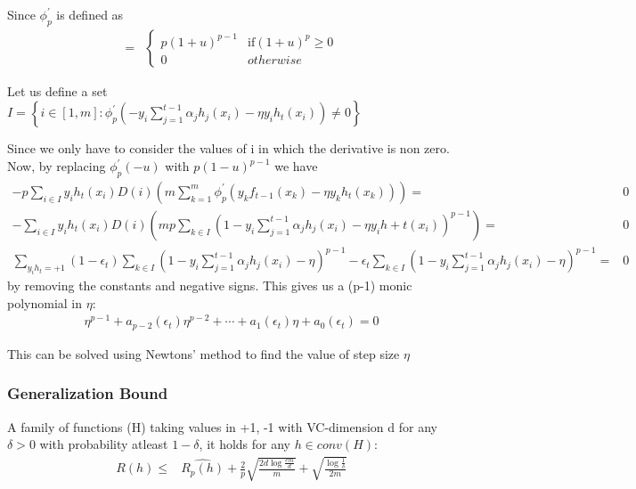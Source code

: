 \documentclass{article}
\begin{document}
Since $\phi^{'}_{p}$ is defined as 
\begin{align*}
  =& \begin{cases}
  p{(1+u)}^{p-1} & \mathrm{if } {(1+u)}^{p} \ge 0 \\
  0 & otherwise
     \end{cases}
\end{align*}

Let us define a set \( I =  \left\{ i \in [1,m] : \phi^{'}_{p}\left( -y_{i}\sum_{j=1}^{t-1} \alpha_{j}h_{j}(x_{i}) - \eta y_{i}h_{t}(x_{i}) \right) \ne 0\right\} \)

Since we  only have to consider the values of i in which the derivative is non zero.  Now, by replacing $\phi^{'}_{p}(-u)$ with $p{(1-u)}^{p-1} $ we have
\begin{align*}
  -p\sum_{i \in I}y_{i}h_{t}(x_{i})D(i)\left(m\sum_{k=1}^{m}\phi^{'}_{p}(y_{k}f_{t-1}(x_{k}) - \eta y_{k}h_{t}(x_{k}) )\right) = & 0 \\
  -\sum_{i \in I} y_{i}h_{t}(x_{i}) D(i) \left( mp\sum_{k\in I}{\left( 1 - y_{i}\sum_{j=1}^{t-1} \alpha_{j}h_{j}(x_{i}) - \eta y_{i}h+{t}(x_{i}) \right)}^{p-1} \right) = & 0 \\
  \sum_{y_{i}h_{t} = +1} (1 - \epsilon_{t})\sum_{k \in I} {\left( 1 - y_{i}\sum_{j=1}^{t-1} \alpha_{j}h_{j}(x_{i}) - \eta \right)}^{p-1} - \epsilon_{t} \sum_{k \in I}  {\left( 1 - y_{i}\sum_{j=1}^{t-1} \alpha_{j}h_{j}(x_{i}) - \eta \right)}^{p-1} = & 0
\end{align*}
by removing the constants and negative signs.  This gives us a (p-1) monic polynomial in $\eta$: 
\begin{align*}
  \eta^{p-1} + a_{p-2}(\epsilon_{t})\eta^{p-2} + \cdots + a_{1}(\epsilon_{t})\eta + a_{0}(\epsilon_{t}) = 0
\end{align*}

This can be solved using Newtons' method to find the value of step size $\eta$


\subsubsection*{Generalization Bound}
A family of functions (H) taking values in {+1, -1} with VC-dimension d for any $ \delta > 0 $ with probability atleast $ 1 - \delta $, it holds for any $h \in conv(H)$:
\begin{align*}
  R(h) \le & \hat{R_{p}(h)} + \frac{2}{p} \sqrt{\frac{2d\log{\frac{em}{d}}}{m}} + \sqrt{\frac{\log{\frac{1}{\delta}}}{2m}}
\end{align*}
\end{document}
